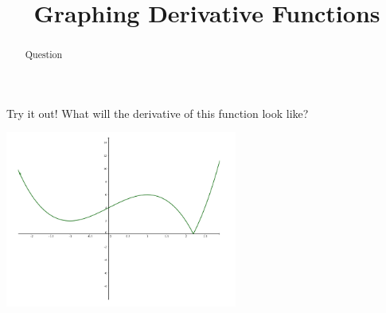 \documentclass[handout]{ximera}
\title{Graphing Derivative Functions}
\begin{document}
\begin{abstract} Question %
\end{abstract}

\maketitle

Try it out! What will the derivative of this function look like?

\includegraphics[width=3in]{graph1.png}
\end{document}
